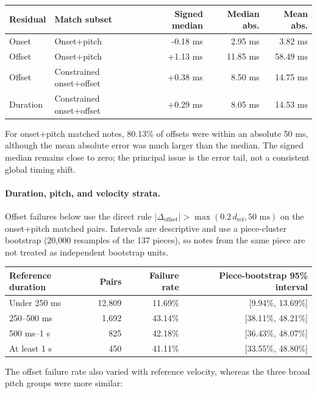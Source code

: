 \documentclass[11pt]{article}
\begin{document}
\begin{center}
\small
\begin{tabular}{p{3.1cm}p{3.5cm}rrr}
\toprule
\textbf{Residual} & \textbf{Match subset} &
\textbf{Signed median} & \textbf{Median abs.} & \textbf{Mean abs.} \\
\midrule
Onset & Onset+pitch & -0.18 ms & 2.95 ms & 3.82 ms \\
Offset & Onset+pitch & +1.13 ms & 11.85 ms & 58.49 ms \\
Offset & Constrained onset+offset & +0.38 ms & 8.50 ms & 14.75 ms \\
Duration & Constrained onset+offset & +0.29 ms & 8.05 ms & 14.53 ms \\
\bottomrule
\end{tabular}
\normalsize
\end{center}

For onset+pitch matched notes, 80.13\% of offsets were within an absolute
50 ms, although the mean absolute error was much larger than the median. The
signed median remains close to zero; the principal issue is the error tail,
not a consistent global timing shift.

\paragraph{Duration, pitch, and velocity strata.}
Offset failures below use the direct rule
$|\Delta_{\mathrm{offset}}| >
\max(0.2\,d_{\mathrm{ref}}, 50\text{ ms})$ on the onset+pitch matched pairs.
Intervals are descriptive and use a piece-cluster bootstrap (20,000
resamples of the 137 pieces), so notes from the same piece are not treated
as independent bootstrap units.

\begin{center}
\begin{tabular}{lrrr}
\toprule
\textbf{Reference duration} & \textbf{Pairs} & \textbf{Failure rate} &
\textbf{Piece-bootstrap 95\% interval} \\
\midrule
Under 250 ms & 12,809 & 11.69\% & [9.94\%, 13.69\%] \\
250--500 ms & 1,692 & 43.14\% & [38.11\%, 48.21\%] \\
500 ms--1 s & 825 & 42.18\% & [36.43\%, 48.07\%] \\
At least 1 s & 450 & 41.11\% & [33.55\%, 48.80\%] \\
\bottomrule
\end{tabular}
\end{center}

The offset failure rate also varied with reference velocity, whereas the
three broad pitch groups were more similar:
\end{document}
